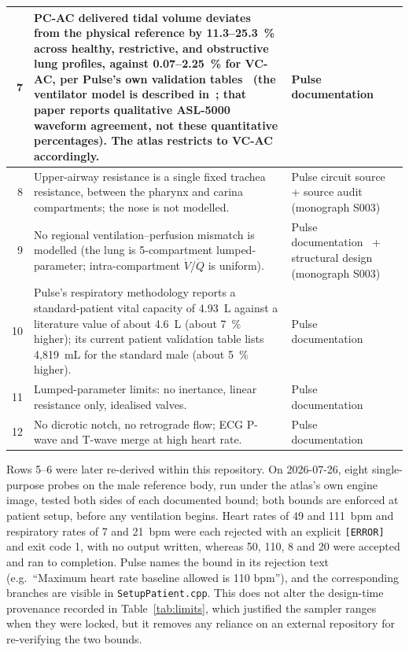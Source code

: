 \documentclass[pdflatex,sn-nature]{sn-jnl}%
\begin{document}
\begin{table}[htbp]
\begin{tabular}{rp{8.5cm}p{3.5cm}}
\midrule
7 & PC-AC delivered tidal volume deviates from the physical reference by 11.3--25.3~\% across healthy, restrictive, and obstructive lung profiles, against 0.07--2.25~\% for VC-AC, per Pulse's own validation tables~\cite{pulsevent} (the ventilator model is described in~\cite{webb2022vent}; that paper reports qualitative ASL-5000 waveform agreement, not these quantitative percentages). The atlas restricts to VC-AC accordingly. & Pulse documentation~\cite{pulsevent} \\
\midrule
8 & Upper-airway resistance is a single fixed trachea resistance, between the pharynx and carina compartments; the nose is not modelled. & Pulse circuit source + source audit (monograph S003) \\
\midrule
9 & No regional ventilation--perfusion mismatch is modelled (the lung is 5-compartment lumped-parameter; intra-compartment $\dot V$/$\dot Q$ is uniform). & Pulse documentation~\cite{pulserespmethod} + structural design (monograph S003) \\
\midrule
10 & Pulse's respiratory methodology reports a standard-patient vital capacity of 4.93~L against a literature value of about 4.6~L (about 7~\% higher); its current patient validation table lists 4{,}819~mL for the standard male (about 5~\% higher). & Pulse documentation~\cite{pulserespmethod,pulsepatientmethod} \\
\midrule
11 & Lumped-parameter limits: no inertance, linear resistance only, idealised valves. & Pulse documentation~\cite{pulserespmethod,pulsecardiomethod} \\
\midrule
12 & No dicrotic notch, no retrograde flow; ECG P-wave and T-wave merge at high heart rate. & Pulse documentation~\cite{pulsecardiomethod} \\
\bottomrule
\end{tabular}
\end{table}

Rows 5--6 were later re-derived within this repository. On 2026-07-26, eight single-purpose probes on the male reference body, run under the atlas's own engine image, tested both sides of each documented bound; both bounds are enforced at patient setup, before any ventilation begins. Heart rates of 49 and 111~bpm and respiratory rates of 7 and 21~bpm were each rejected with an explicit \texttt{[ERROR]} and exit code 1, with no output written, whereas 50, 110, 8 and 20 were accepted and ran to completion. Pulse names the bound in its rejection text (e.g.\ ``Maximum heart rate baseline allowed is 110 bpm''), and the corresponding branches are visible in \texttt{SetupPatient.cpp}. This does not alter the design-time provenance recorded in Table~\ref{tab:limits}, which justified the sampler ranges when they were locked, but it removes any reliance on an external repository for re-verifying the two bounds.
\end{document}
